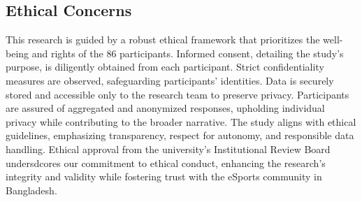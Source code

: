 \documentclass[manuscript,screen,review,anonymous]{acmart}
\begin{document}





\subsection{Ethical Concerns}
This research is guided by a robust ethical framework that prioritizes the well-being and rights of the 86 participants. Informed consent, detailing the study's purpose, is diligently obtained from each participant. Strict confidentiality measures are observed, safeguarding participants' identities. Data is securely stored and accessible only to the research team to preserve privacy. Participants are assured of aggregated and anonymized responses, upholding individual privacy while contributing to the broader narrative. The study aligns with ethical guidelines, emphasizing transparency, respect for autonomy, and responsible data handling. Ethical approval from the university’s Institutional Review Board undersdcores our commitment to ethical conduct, enhancing the research's integrity and validity while fostering trust with the eSports community in Bangladesh.
\end{document}
